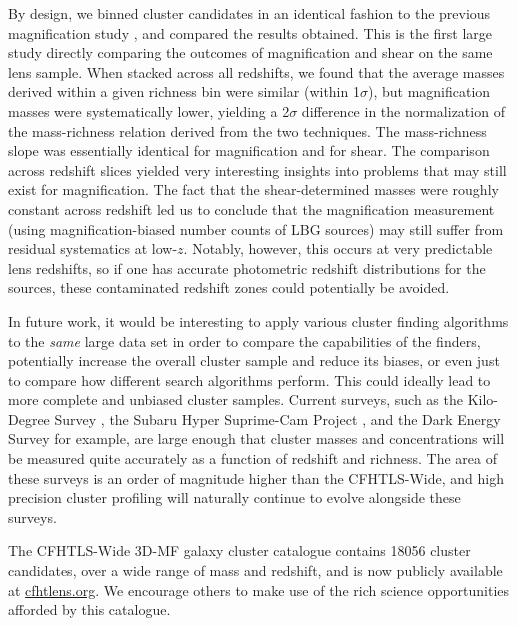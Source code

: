 By design, we binned cluster candidates in an identical fashion to the previous magnification study \citep{Ford14}, and compared the results obtained. This is the first large study directly comparing the outcomes of magnification and shear on the same lens sample. When stacked across all redshifts, we found that the average masses derived within a given richness bin were similar (within 1$\sigma$), but magnification masses were systematically lower, yielding a 2$\sigma$ difference in the normalization of the mass-richness relation derived from the two techniques. The mass-richness slope was essentially identical for magnification and for shear. The comparison across redshift slices yielded very interesting insights into problems that may still exist for magnification. The fact that the shear-determined masses were roughly constant across redshift led us to conclude that the magnification measurement (using magnification-biased number counts of \ac{LBG} sources) may still suffer from residual systematics at low-$z$. Notably, however, this occurs at very predictable lens redshifts, so if one has accurate photometric redshift distributions for the sources, these contaminated redshift zones could potentially be avoided.

In future work, it would be interesting to apply various cluster finding algorithms to the {\em same} large data set in order to compare the capabilities of the finders, potentially increase the overall cluster sample and reduce its biases, or even just to compare how different search algorithms perform.  This could ideally lead to more complete and unbiased cluster samples. Current surveys, such as the Kilo-Degree Survey \citep{KiDS13}, the Subaru Hyper Suprime-Cam Project \citep{HSC10}, and the Dark Energy Survey \citep{DES05} for example, are large enough that cluster masses and concentrations will be measured quite accurately as a function of redshift and richness. The area of these surveys is an order of magnitude higher than the \ac{CFHTLS}-Wide, and high precision cluster profiling will naturally continue to evolve alongside these surveys.

The \ac{CFHTLS}-Wide \ac{3D-MF} galaxy cluster catalogue contains 18056 cluster candidates, over a wide range of mass and redshift, and is now publicly available at \url{cfhtlens.org}. We encourage others to make use of the rich science opportunities afforded by this catalogue. 










